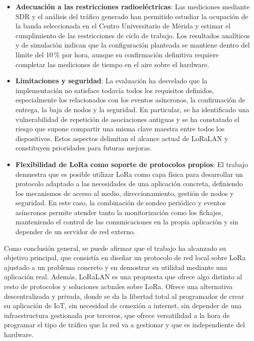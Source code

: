 \begin{itemize}
\item \textbf{Adecuación a las restricciones radioeléctricas}: Las mediciones mediante SDR y el análisis del tráfico generado han permitido estudiar la ocupación de la banda seleccionada en el Centro Universitario de Mérida y estimar el cumplimiento de las restricciones de ciclo de trabajo. Los resultados analíticos y de simulación indican que la configuración planteada se mantiene dentro del límite del 10\,\% por hora, aunque su confirmación definitiva requiere completar las mediciones de tiempo en el aire sobre el hardware.

\item \textbf{Limitaciones y seguridad}: La evaluación ha desvelado que la implementación no satisface todavía todos los requisitos definidos, especialmente los relacionados con los eventos asíncronos, la confirmación de entrega, la baja de nodos y la seguridad. En particular, se ha identificado una vulnerabilidad de repetición de asociaciones antiguas y se ha constatado el riesgo que supone compartir una misma clave maestra entre todos los dispositivos. Estos aspectos delimitan el alcance actual de LoRaLAN y constituyen prioridades para futuras mejoras.

\item \textbf{Flexibilidad de LoRa como soporte de protocolos propios}: El trabajo demuestra que es posible utilizar LoRa como capa física para desarrollar un protocolo adaptado a las necesidades de una aplicación concreta, definiendo los mecanismos de acceso al medio, direccionamiento, gestión de nodos y seguridad. En este caso, la combinación de sondeo periódico y eventos asíncronos permite atender tanto la monitorización como los fichajes, manteniendo el control de las comunicaciones en la propia aplicación y sin depender de un servidor de red externo.

\end{itemize}

Como conclusión general, se puede afirmar que el trabajo ha alcanzado su objetivo principal, que consistía en diseñar un protocolo de red local sobre LoRa ajustado a un problema concreto y en demostrar su utilidad mediante una aplicación real. Además, LoRaLAN es una propuesta que ofrece algo distinto al resto de protocolos y soluciones actuales sobre LoRa. Ofrece una alternativa descentralizada y privada, donde se da la libertad total al programador de crear su aplicación de IoT, sin necesidad de conexión a internet, sin depender de una infraestructura gestionada por terceros, que ofrece versatilidad a la hora de programar el tipo de tráfico que la red va a gestionar y que es independiente del hardware.
 
